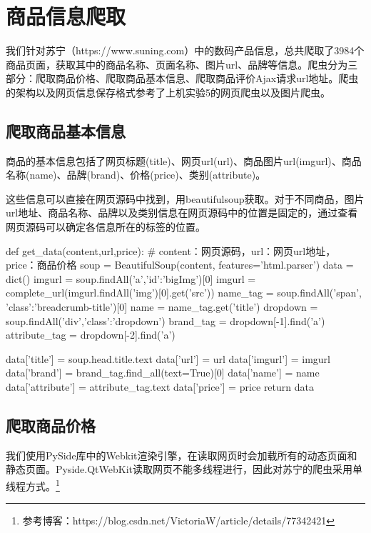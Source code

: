 \section{商品信息爬取}

我们针对苏宁（https://www.suning.com）中的数码产品信息，总共爬取了3984个商品页面，获取其中的商品名称、页面名称、图片url、品牌等信息。爬虫分为三部分：爬取商品价格、爬取商品基本信息、爬取商品评价Ajax请求url地址。爬虫的架构以及网页信息保存格式参考了上机实验5的网页爬虫以及图片爬虫。

\subsection{爬取商品基本信息}

商品的基本信息包括了网页标题(title)、网页url(url)、商品图片url(imgurl)、商品名称(name)、品牌(brand)、价格(price)、类别(attribute)。

这些信息可以直接在网页源码中找到，用beautifulsoup获取。对于不同商品，图片url地址、商品名称、品牌以及类别信息在网页源码中的位置是固定的，通过查看网页源码可以确定各信息所在的标签的位置。

\begin{python}
def get_data(content,url,price): # content：网页源码，url：网页url地址，price：商品价格
    soup = BeautifulSoup(content, features='html.parser')
    data = dict()
    imgurl = soup.findAll('a',{'id':'bigImg'})[0]
    imgurl = complete_url(imgurl.findAll('img')[0].get('src'))
    name_tag = soup.findAll('span', {'class':'breadcrumb-title'})[0]
    name = name_tag.get('title')
    dropdown = soup.findAll('div',{'class':'dropdown'})
    brand_tag = dropdown[-1].find('a')
    attribute_tag = dropdown[-2].find('a')

    data['title'] = soup.head.title.text
    data['url'] = url
    data['imgurl'] = imgurl
    data['brand'] = brand_tag.find_all(text=True)[0]
    data['name'] = name
    data['attribute'] = attribute_tag.text
    data['price'] = price
    return data
\end{python}

\subsection{爬取商品价格}

我们使用PySide库中的Webkit渲染引擎，在读取网页时会加载所有的动态页面和静态页面。Pyside.QtWebKit读取网页不能多线程进行，因此对苏宁的爬虫采用单线程方式。\footnote{参考博客：https://blog.csdn.net/VictoriaW/article/details/77342421}​

